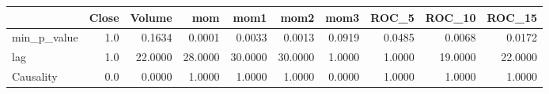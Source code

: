 \begin{tabular}{lrrrrrrrrr}
\toprule
{} &  Close &   Volume &      mom &     mom1 &     mom2 &    mom3 &   ROC\_5 &   ROC\_10 &   ROC\_15 \\
\midrule
min\_p\_value &    1.0 &   0.1634 &   0.0001 &   0.0033 &   0.0013 &  0.0919 &  0.0485 &   0.0068 &   0.0172 \\
lag         &    1.0 &  22.0000 &  28.0000 &  30.0000 &  30.0000 &  1.0000 &  1.0000 &  19.0000 &  22.0000 \\
Causality   &    0.0 &   0.0000 &   1.0000 &   1.0000 &   1.0000 &  0.0000 &  1.0000 &   1.0000 &   1.0000 \\
\bottomrule
\end{tabular}
